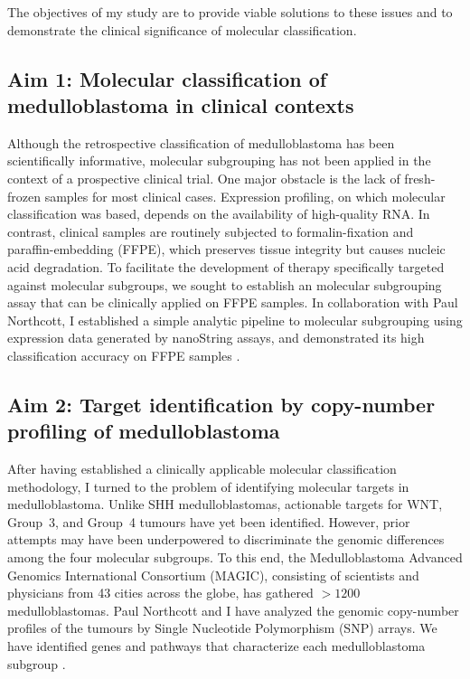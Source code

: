 \documentclass[11pt,letterpaper]{article}
\theoremstyle{definition}
\begin{document}
The objectives of my study are to provide viable solutions to these issues and to demonstrate the clinical significance of molecular classification.

\subsection{Aim 1: Molecular classification of medulloblastoma in clinical contexts}

Although the retrospective classification of medulloblastoma has been scientifically informative, molecular subgrouping has not been applied in the context of a prospective clinical trial. One major obstacle is the lack of fresh-frozen samples for most clinical cases. Expression profiling, on which molecular classification was based, depends on the availability of high-quality RNA. In contrast, clinical samples are routinely subjected to formalin-fixation and paraffin-embedding (FFPE), which preserves tissue integrity but causes nucleic acid degradation. To facilitate the development of therapy specifically targeted against molecular subgroups, we sought to establish an molecular subgrouping assay that can be clinically applied on FFPE samples. In collaboration with Paul Northcott, I established a simple analytic pipeline to molecular subgrouping using expression data generated by nanoString assays, and demonstrated its high classification accuracy on FFPE samples .

\subsection{Aim 2: Target identification by copy-number profiling of medulloblastoma}

After having established a clinically applicable molecular classification methodology, I turned to the problem of identifying molecular targets in medulloblastoma. Unlike SHH medulloblastomas, actionable targets for WNT, Group~3, and Group~4 tumours have yet been identified. However, prior attempts may have been underpowered to discriminate the genomic differences among the four molecular subgroups. To this end, the Medulloblastoma Advanced Genomics International Consortium (MAGIC), consisting of scientists and physicians from 43 cities across the globe, has gathered $>1200$ medulloblastomas. Paul Northcott and I have analyzed the genomic copy-number profiles of the tumours by Single Nucleotide Polymorphism (SNP) arrays. We have identified genes and pathways that characterize each medulloblastoma subgroup .
\end{document}
